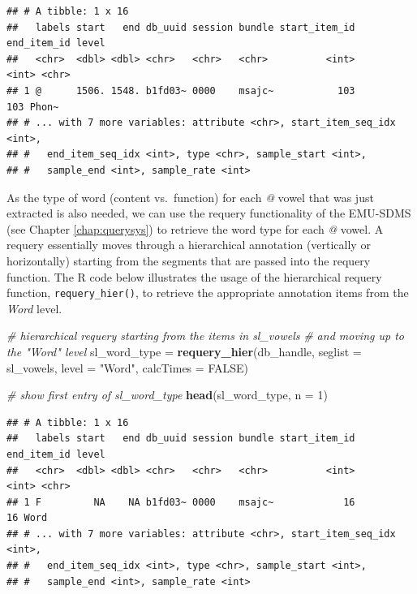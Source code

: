 \documentclass[]{book}
\newenvironment{Shaded}{\begin{snugshade}}{\end{snugshade}}
\newcommand{\CommentTok}[1]{\textcolor[rgb]{0.56,0.35,0.01}{\textit{#1}}}
\newcommand{\DataTypeTok}[1]{\textcolor[rgb]{0.13,0.29,0.53}{#1}}
\newcommand{\DecValTok}[1]{\textcolor[rgb]{0.00,0.00,0.81}{#1}}
\newcommand{\KeywordTok}[1]{\textcolor[rgb]{0.13,0.29,0.53}{\textbf{#1}}}
\newcommand{\NormalTok}[1]{#1}
\newcommand{\OtherTok}[1]{\textcolor[rgb]{0.56,0.35,0.01}{#1}}
\newcommand{\StringTok}[1]{\textcolor[rgb]{0.31,0.60,0.02}{#1}}
\begin{document}
\begin{verbatim}
## # A tibble: 1 x 16
##   labels start   end db_uuid session bundle start_item_id end_item_id level
##   <chr>  <dbl> <dbl> <chr>   <chr>   <chr>          <int>       <int> <chr>
## 1 @      1506. 1548. b1fd03~ 0000    msajc~           103         103 Phon~
## # ... with 7 more variables: attribute <chr>, start_item_seq_idx <int>,
## #   end_item_seq_idx <int>, type <chr>, sample_start <int>,
## #   sample_end <int>, sample_rate <int>
\end{verbatim}

As the type of word (content vs.~function) for each \emph{@} vowel that was just extracted is also needed, we can use the requery functionality of the EMU-SDMS (see Chapter \ref{chap:querysys}) to retrieve the word type for each \emph{@} vowel. A requery essentially moves through a hierarchical annotation (vertically or horizontally) starting from the segments that are passed into the requery function. The R code below illustrates the usage of the hierarchical requery function, \texttt{requery\_hier()}, to retrieve the appropriate annotation items from the \emph{Word} level.

\begin{Shaded}
\begin{Highlighting}[]
\CommentTok{# hierarchical requery starting from the items in sl_vowels}
\CommentTok{# and moving up to the "Word" level}
\NormalTok{sl_word_type =}\StringTok{ }\KeywordTok{requery_hier}\NormalTok{(db_handle,}
                           \DataTypeTok{seglist =}\NormalTok{ sl_vowels,}
                           \DataTypeTok{level =} \StringTok{"Word"}\NormalTok{,}
                           \DataTypeTok{calcTimes =} \OtherTok{FALSE}\NormalTok{)}

\CommentTok{# show first entry of sl_word_type}
\KeywordTok{head}\NormalTok{(sl_word_type, }\DataTypeTok{n =} \DecValTok{1}\NormalTok{)}
\end{Highlighting}
\end{Shaded}

\begin{verbatim}
## # A tibble: 1 x 16
##   labels start   end db_uuid session bundle start_item_id end_item_id level
##   <chr>  <dbl> <dbl> <chr>   <chr>   <chr>          <int>       <int> <chr>
## 1 F         NA    NA b1fd03~ 0000    msajc~            16          16 Word 
## # ... with 7 more variables: attribute <chr>, start_item_seq_idx <int>,
## #   end_item_seq_idx <int>, type <chr>, sample_start <int>,
## #   sample_end <int>, sample_rate <int>
\end{verbatim}
\end{document}
